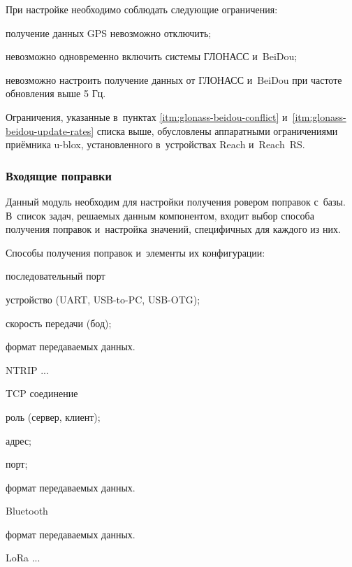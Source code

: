 При настройке необходимо соблюдать следующие ограничения:
\begin{alphitemize}
  \item получение данных GPS невозможно отключить;
  \item \label{itm:glonass-beidou-conflict} невозможно одновременно включить системы ГЛОНАСС и~BeiDou;
  \item \label{itm:glonass-beidou-update-rates} невозможно настроить получение данных от ГЛОНАСС и~BeiDou при частоте обновления выше 5 Гц.
\end{alphitemize}

Ограничения, указанные в~пунктах \ref{itm:glonass-beidou-conflict} и~\ref{itm:glonass-beidou-update-rates} списка выше, обусловлены аппаратными ограничениями приёмника u-blox, установленного в~устройствах Reach и~Reach~RS.

\subsubsection{Входящие поправки}

Данный модуль необходим для настройки получения ровером поправок с~базы. В~список задач, решаемых данным компонентом, входит выбор способа получения поправок и~настройка значений, специфичных для каждого из них.

Способы получения поправок и~элементы их конфигурации:
\begin{dashitemize}
  \item последовательный порт
  \begin{dashitemize}
    \item устройство (UART, USB-to-PC, USB-OTG);
    \item скорость передачи (бод);
    \item формат передаваемых данных.
  \end{dashitemize}

  \item NTRIP ...

  \item TCP соединение
  \begin{dashitemize}
    \item роль (сервер, клиент);
    \item адрес;
    \item порт;
    \item формат передаваемых данных.
  \end{dashitemize}

  \item Bluetooth
  \begin{dashitemize}
    \item формат передаваемых данных.
  \end{dashitemize}

  \item LoRa ...
\end{dashitemize}

